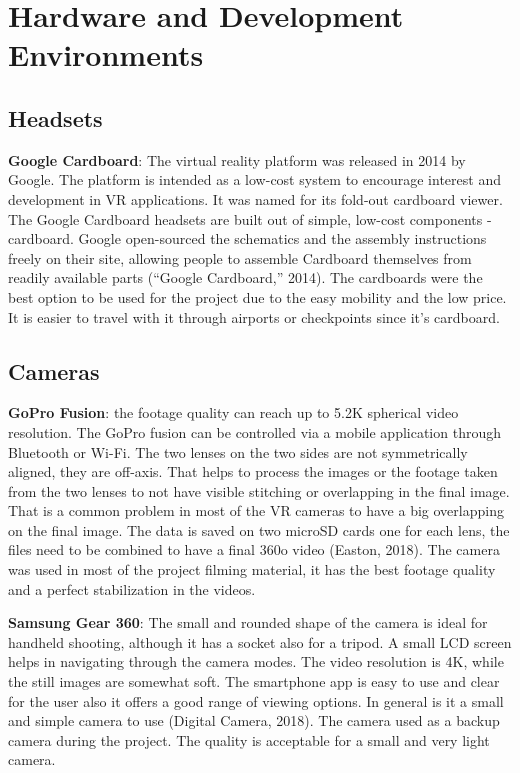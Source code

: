 
\section{Hardware and Development Environments}
\subsection{Headsets}
\textbf{Google Cardboard}: The virtual reality platform was released in
2014 by Google. The platform is intended as a low-cost system to
encourage interest and development in VR applications. It was
named for its fold-out cardboard viewer. The Google Cardboard
headsets are built out of simple, low-cost components -
cardboard. Google open-sourced the schematics and the
assembly instructions freely on their site, allowing people to
assemble Cardboard themselves from readily available parts (“Google Cardboard,” 2014). The
cardboards were the best option to be used for the project due to the easy mobility and the
low price. It is easier to travel with it through airports or checkpoints since it’s cardboard.
\subsection{Cameras}
\textbf{GoPro Fusion}: the footage quality can reach up to 5.2K spherical video
resolution. The GoPro fusion can be controlled via a mobile
application through Bluetooth or Wi-Fi. The two lenses on the two
sides are not symmetrically aligned, they are off-axis. That helps to
process the images or the footage taken from the two lenses to not
have visible stitching or overlapping in the final image. That is a
common problem in most of the VR cameras to have a big overlapping on the final image. The
data is saved on two microSD cards one for each lens, the files need to be combined to have
a final 360o video (Easton, 2018). The camera was used in most of the project filming material,
it has the best footage quality and a perfect stabilization in the videos.


\textbf{Samsung Gear 360}: The small and rounded shape of the camera is ideal for
handheld shooting, although it has a socket also for a tripod. A small LCD
screen helps in navigating through the camera modes. The video resolution is
4K, while the still images are somewhat soft. The smartphone app is easy to
use and clear for the user also it offers a good range of viewing options. In
general is it a small and simple camera to use (Digital Camera, 2018). The
camera used as a backup camera during the project. The quality is acceptable
for a small and very light camera.

